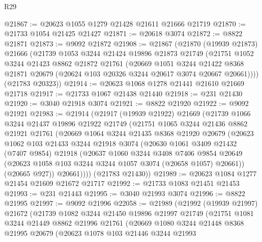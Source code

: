 \begin{lexlean}{R29}
\begin{coremodule}
@21867 := @20623 @1055 @1279 @21428 @21611 @21666 @21719
@21870 := @21733 @1054 @21425 @21427
@21871 := @20618 @3074
@21872 := @8822 @21871
@21873 := @9092 @21872
@21908 := @21867
    (@21870
      (@19939 @21873)
      @21666
      (@21739
        @1053
        @3244
        @21424
        @19896
        @21873
        @21749
        (@21751
          @1052
          @3244
          @21423
          @8862
          @21872
          @21761
          (@20669
            @1051
            @3244
            @21422
            @8368
            @21871
            @20679
            (@20624 @103 @20326 @3244 @20617 @3074 @20667 @20661))))
      (@21783 @20323))
@21914 := @20623 @1068 @1278 @21441 @21610 @21669 @21718
@21917 := @21733 @1067 @21438 @21440
@21918 := @231 @21430
@21920 := @3040 @21918 @3074
@21921 := @8822 @21920
@21922 := @9092 @21921
@21983 := @21914
    (@21917
      (@19939 @21922)
      @21669
      (@21739
        @1066
        @3244
        @21437
        @19896
        @21922
        @21749
        (@21751
          @1065
          @3244
          @21436
          @8862
          @21921
          @21761
          (@20669
            @1064
            @3244
            @21435
            @8368
            @21920
            @20679
            (@20623
              @1062
              @103
              @21433
              @3244
              @21918
              @3074
              (@20630
                @1061
                @3409
                @21432
                (@7407 @9854)
                @21918
                (@20637
                  @1060
                  @3244
                  @3408
                  @7406
                  @9854
                  @20649
                  (@20623 @1058 @103 @3244 @3244 @1057 @3074 (@20658 @1057) @20661))
                (@20665 @927))
              @20661))))
      (@21783 @21430))
@21989 := @20623 @1084 @1277 @21454 @21609 @21672 @21717
@21992 := @21733 @1083 @21451 @21453
@21993 := @231 @21443
@21995 := @3040 @21993 @3074
@21996 := @8822 @21995
@21997 := @9092 @21996
@22058 := @21989
    (@21992
      (@19939 @21997)
      @21672
      (@21739
        @1082
        @3244
        @21450
        @19896
        @21997
        @21749
        (@21751
          @1081
          @3244
          @21449
          @8862
          @21996
          @21761
          (@20669
            @1080
            @3244
            @21448
            @8368
            @21995
            @20679
            (@20623
              @1078
              @103
              @21446
              @3244
              @21993

\end{coremodule}
\end{lexlean}
